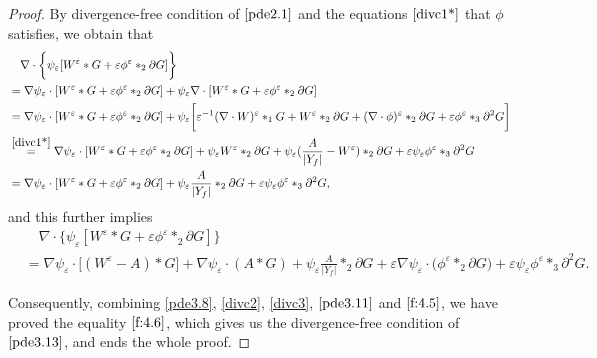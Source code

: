 \documentclass[13pt,CJK]{article}
\theoremstyle{plain}                       %
\theoremstyle{remark}
\numberwithin{equation}{section}
\begin{document}
\begin{proof}
\medskip

By divergence-free condition of $\eqref{pde2.1}$ and the equations $\eqref{divc1*}$
that $\phi$ satisfies, we obtain that
\begin{equation*}
\begin{aligned}
&\quad\nabla\cdot
\bigg\{
\psi_{\varepsilon}[W^{\varepsilon}\ast G+\varepsilon\phi^{\varepsilon}\ast_2 \partial G]
\bigg\}\\
&=\nabla\psi_{\varepsilon}\cdot[W^{\varepsilon}\ast G+\varepsilon\phi^{\varepsilon}\ast_2\partial G]
+\psi_{\varepsilon}\nabla\cdot[W^{\varepsilon}\ast G+\varepsilon\phi^{\varepsilon}\ast_2\partial G]\\
&=\nabla\psi_{\varepsilon}\cdot[W^{\varepsilon}\ast G+\varepsilon\phi^{\varepsilon}\ast_2\partial G]
+\psi_{\varepsilon}\bigg[
\varepsilon^{-1}(\nabla\cdot W)^{\varepsilon}\ast_1 G+W^{\varepsilon}\ast_2\partial G
+(\nabla\cdot\phi)^{\varepsilon}\ast_2\partial G
+\varepsilon\phi^{\varepsilon}\ast_{3}\partial^2 G
\bigg]\\
&\overset{\eqref{divc1*}}{=}\nabla\psi_{\varepsilon}\cdot[W^{\varepsilon}\ast G+\varepsilon\phi^{\varepsilon}\ast_2\partial G]
+\psi_{\varepsilon}W^{\varepsilon}\ast_2\partial G
+\psi_{\varepsilon}
(\frac{A}{|Y_f|}-W^{\varepsilon}
)\ast_2\partial G
+\varepsilon\psi_{\varepsilon}
\phi^{\varepsilon}\ast_3\partial^2 G\\
&=
\nabla\psi_{\varepsilon}\cdot[W^{\varepsilon}\ast G+\varepsilon\phi^{\varepsilon}\ast_2\partial G]
+\psi_{\varepsilon}
\frac{A}{|Y_f|}\ast_2\partial G
+\varepsilon\psi_{\varepsilon}
\phi^{\varepsilon}\ast_3\partial^2G,
\end{aligned}
\end{equation*}
and this further implies
\begin{equation}\label{f:4.5}
\begin{aligned}
&\quad\nabla\cdot
\bigg\{
\psi_{\varepsilon}[W^{\varepsilon}\ast G+\varepsilon\phi^{\varepsilon}\ast_2 \partial G]
\bigg\}\\
&=\nabla\psi_{\varepsilon}\cdot\big[(W^{\varepsilon}
-A)\ast G\big]
+\nabla\psi_{\varepsilon}\cdot(A\ast G)
+\psi_{\varepsilon}
\frac{A}{|Y_f|}\ast_2\partial G
+\varepsilon\nabla\psi_{\varepsilon}
\cdot\big(\phi^{\varepsilon}\ast_2\partial G\big)
+\varepsilon\psi_{\varepsilon}
\phi^{\varepsilon}\ast_3\partial^2G.
\end{aligned}
\end{equation}

\medskip

Consequently, combining \eqref{pde3.8}, \eqref{divc2}, \eqref{divc3},
$\eqref{pde3.11}$
and $\eqref{f:4.5}$, we have proved
the equality $\eqref{f:4.6}$, which gives us
the divergence-free condition of $\eqref{pde3.13}$,
and ends the whole proof.
\end{proof}
\end{document}
